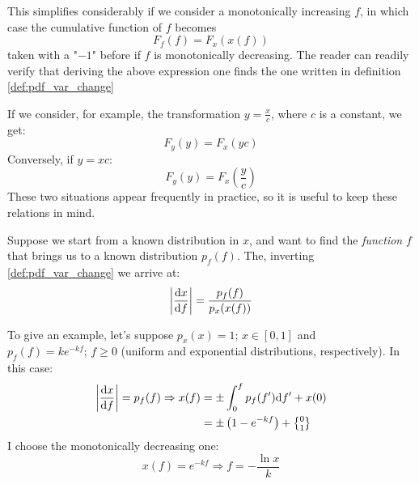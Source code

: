 This simplifies considerably if we consider a monotonically increasing $f$, in which case the cumulative function of $f$ becomes
	\[
	F_f(f)= F_x\left(x(f)\right)
	\]
taken with a "$-1$" before if $f$ is monotonically decreasing. The reader can readily verify that deriving the above expression one finds the one written in definition \ref{def:pdf_var_change}

If we consider, for example, the transformation $y=\frac{x}{c}$, where $c$ is a constant, we get:
\[
	F_y(y)=F_x(yc)
\]
Conversely, if $y=xc$:
\[
	F_y(y)=F_x\left(\frac{y}{c}\right)
\]
These two situations appear frequently in practice, so it is useful to keep these relations in mind.

\begin{example}
	Suppose we start from a known distribution in $x$, and want to find the \emph{function} $f$ that brings us to a known distribution $p_f(f)$. The, inverting \ref{def:pdf_var_change} we arrive at:
	\[
	\left| \frac{\mathrm{d} x}{\mathrm{d} f} \right| = \frac{p_f(f)}{p_x(x(f))}
	\]
	
	To give an example, let's suppose $p_x(x) = 1; \, x\in[0,1]$ and $p_f(f) = ke^{-kf}; \, f\geq 0$ (uniform and exponential distributions, respectively). In this case:
	\begin{align*}
	\left| \dv{x}{f} \right| = p_f(f) \Rightarrow x(f) &= \pm \int_0^f p_f(f^\prime)\dd f^\prime + x(0) \\
	&= \pm\left( 1-e^{-kf}\right) + \genfrac{\{}{\}}{0pt}{1}{0}{1}
	\end{align*}
	I choose the monotonically decreasing one:
	\[
	x(f) = e^{-kf} \Rightarrow f = -\frac{\ln{x}}{k}
	\]
\end{example}

